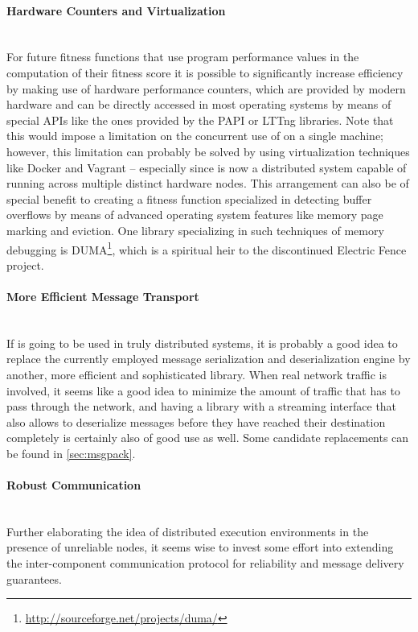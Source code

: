 \paragraph{Hardware Counters and Virtualization} ~\\
For future fitness functions that use program performance values in the computation of their
fitness score it is possible to significantly increase efficiency by making use of hardware performance
counters, which are provided by modern hardware and can be directly accessed in most operating systems by
means of special APIs like the ones provided by the {\small PAPI}\cite{Mucci99papi:a} or {\small LTTng}\cite{
combined_tracing_ols2009} libraries. Note that this would impose a limitation on the concurrent use of \xmlmate
on a single machine; however, this limitation can probably be solved by using virtualization techniques like
{\small Docker}\cite{docker} and {\small Vagrant}\cite{vagrant} -- especially since \xmlmate is now a
distributed system capable of running across multiple distinct hardware nodes. This arrangement can also be of
special benefit to creating a fitness function specialized in detecting buffer overflows by means of advanced
operating system features like memory page marking and eviction. One library specializing in such techniques
of memory debugging is {\small DUMA}\footnote{\url{http://sourceforge.net/projects/duma/}}, which is a
spiritual heir to the discontinued Electric Fence project.
\paragraph{More Efficient Message Transport} ~\\
If \xmlmate is going to be used in truly distributed systems, it is probably a good idea to replace
the currently employed \msgpack message serialization and deserialization engine by another, more efficient and
sophisticated library. When real network traffic is involved, it seems like a good idea to minimize the amount
of traffic that has to pass through the network, and having a library with a streaming interface that also
allows to deserialize messages before they have reached their destination completely is certainly also of
good use as well. Some candidate replacements can be found in \cref{sec:msgpack}.
\paragraph{Robust Communication} ~\\
Further elaborating the idea of distributed execution environments in the presence of unreliable
nodes, it seems wise to invest some effort into extending the inter-component communication protocol for
reliability and message delivery guarantees.
